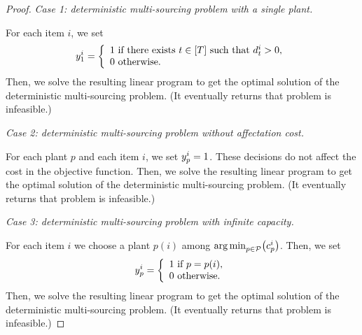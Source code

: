 \begin{proof}
\emph{Case 1: deterministic multi-sourcing problem with a single plant.}

For each item $i$, we set
$$
\open_1^i=
\left\{
\begin{array}{l}
1\mbox{ if there exists }t\in\range{\horizon}\mbox{ such that }\demand_t^i>0,\\
0\mbox{ otherwise}.
\end{array}
\right.
$$
Then, we solve the resulting linear program to get the optimal solution of the deterministic multi-sourcing problem.
(It eventually returns that problem is infeasible.)

\medskip

\emph{Case 2: deterministic multi-sourcing problem without affectation cost.}

For each plant $p$ and each item $i$, we set $y_p^i=1$.
These decisions do not affect the cost in the objective function.
Then, we solve the resulting linear program to get the optimal solution of the deterministic multi-sourcing problem.
(It eventually returns that problem is infeasible.)

\medskip

\emph{Case 3: deterministic multi-sourcing problem with infinite capacity.}

For each item $i$ we choose a plant $p(i)$ among $\argmin_{p\in\plants}\bracket{\affect_p^i}$.
Then, we set
$$
\open_p^i=
\left\{
\begin{array}{l}
1\mbox{ if }p=p(i),\\
0\mbox{ otherwise}.
\end{array}
\right.
$$
Then, we solve the resulting linear program to get the optimal solution of the deterministic multi-sourcing problem.
(It eventually returns that problem is infeasible.)
\end{proof}



